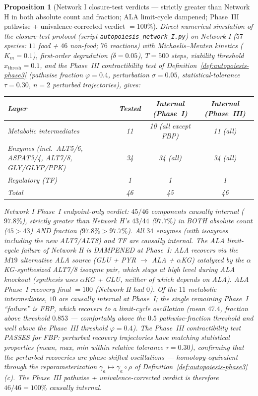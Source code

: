 \documentclass[11pt,a4paper]{article}
\theoremstyle{plain}
\newtheorem{proposition}[theorem]{Proposition}
\theoremstyle{definition}
\theoremstyle{remark}
\begin{document}
\begin{proposition}[Network I closure-test verdicts --- strictly
greater than Network H in both absolute count and fraction; ALA
limit-cycle dampened; Phase~III pathwise + univalence-corrected verdict
$= 100\%$]
\label{prop:netI-verdict}
Direct numerical simulation of the closure-test protocol
(script \texttt{autopoiesis\_network\_I.py}) on Network I
($57$ species: $11$ food + $46$ non-food; $76$ reactions) with
Michaelis--Menten kinetics ($K_m = 0.1$), first-order degradation
($\delta = 0.05$), $T = 500$ steps, viability threshold
$x_{\mathrm{thresh}} = 0.1$, and the Phase~III contractibility test
of Definition~\ref{def:autopoiesis-phase3} (pathwise fraction
$\varphi = 0.4$, perturbation $\sigma = 0.05$, statistical-tolerance
$\tau = 0.30$, $n = 2$ perturbed trajectories), gives:
\begin{center}\footnotesize
\begin{tabular}{lccc}
\toprule
Layer & Tested & Internal (Phase~I) & Internal (Phase~III) \\
\midrule
Metabolic intermediates & 11 & 10 (all except FBP) & 11 (all) \\
Enzymes (incl.~ALT5/6, ASPAT3/4, ALT7/8, GLY/GLYP/PPK) & 34 & 34 (all) & 34 (all) \\
Regulatory (TF) & 1 & 1 & 1 \\
\midrule
Total & 46 & 45 & 46 \\
\bottomrule
\end{tabular}
\end{center}
Network I Phase~I endpoint-only verdict: $45/46$ components causally
internal ($97.8\%$), strictly greater than Network H's $43/44$
($97.7\%$) in BOTH absolute count ($45 > 43$) AND fraction
($97.8\% > 97.7\%$). All $34$ enzymes (with isozymes including the new
ALT7/ALT8) and TF are causally internal. The ALA limit-cycle failure of
Network H is DAMPENED at Phase~I: ALA recovers via the $M19$ alternative
ALA source (GLU + PYR $\to$ ALA + $\alpha$KG) catalyzed by the
$\alpha$KG-synthesized ALT7/8 isozyme pair, which stays at high level
during ALA knockout (synthesis uses $\alpha$KG + GLU, neither of which
depends on ALA). ALA Phase~I recovery final $= 100$ (Network H had
$0$). Of the $11$ metabolic intermediates, $10$ are causally internal at
Phase~I; the single remaining Phase~I ``failure'' is FBP, which recovers
to a limit-cycle oscillation (mean $47.4$, fraction above threshold
$0.853$ --- comfortably above the $0.5$ pathwise-fraction threshold and
well above the Phase~III threshold $\varphi = 0.4$). The Phase~III
contractibility test PASSES for FBP: perturbed recovery trajectories have
matching statistical properties (mean, max, min within relative tolerance
$\tau = 0.30$), confirming that the perturbed recoveries are
phase-shifted oscillations --- homotopy-equivalent through the
reparameterization $\gamma_a \mapsto \gamma_a \circ \rho$ of
Definition~\ref{def:autopoiesis-phase3}(c). The Phase~III pathwise +
univalence-corrected verdict is therefore $46/46 = 100\%$ causally
internal.
\end{proposition}
\end{document}
